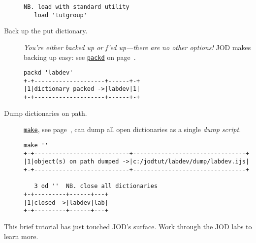 \begin{description}
\begin{lstlisting}[frame=single,framerule=0pt]
   NB. load with standard utility
   load 'tutgroup'  
\end{lstlisting}

\item[Back up the put dictionary.] \emph{You're either backed up or f'ed up---there are
no other options!} JOD makes backing up 
easy: see \hyperlink{il:packd}{\texttt{packd}} on page~\pageref{ss:packd}.
\begin{lstlisting}[frame=single,framerule=0pt] 
   packd 'labdev'
+-+--------------------+------+-+
|1|dictionary packed ->|labdev|1|
+-+--------------------+------+-+
\end{lstlisting}

\item[Dump dictionaries on path.] \hyperlink{il:make}{\texttt{make}}, see page~\pageref{ss:make},
can dump all open dictionaries as a single \emph{dump script.}
\begin{lstlisting}[frame=single,framerule=0pt]
   make ''
+-+---------------------------+--------------------------------+
|1|object(s) on path dumped ->|c:/jodtut/labdev/dump/labdev.ijs|
+-+---------------------------+--------------------------------+

   3 od '' 	NB. close all dictionaries
+-+---------+------+---+
|1|closed ->|labdev|lab|
+-+---------+------+---+
\end{lstlisting}

\end{description}

This brief tutorial has just touched JOD's surface.  Work through the JOD labs to learn more.